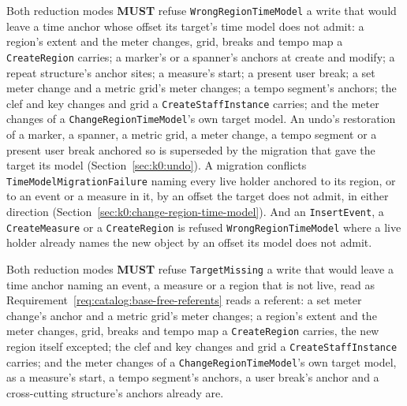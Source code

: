 \documentclass[11pt,letterpaper]{report}
\newcounter{requirement}[chapter]
\newcommand{\MUST}{\textbf{MUST}}
\begin{document}
\begin{requirement}
  \label{req:catalog:anchor-offsets}
  Both reduction modes \MUST{} refuse \texttt{WrongRegionTimeModel} a write
  that would leave a time anchor whose offset its target's time model does not
  admit: a region's extent and the meter changes, grid, breaks and tempo map a
  \texttt{CreateRegion} carries; a marker's or a spanner's anchors at create and
  modify; a repeat structure's anchor sites; a measure's start; a present user
  break; a set meter change and a metric grid's meter changes; a tempo
  segment's anchors; the clef and key changes and grid a
  \texttt{CreateStaffInstance} carries; and the meter changes of a
  \texttt{ChangeRegionTimeModel}'s own target model. An undo's restoration of
  a marker, a spanner, a metric grid, a meter change, a tempo segment or a
  present user break anchored so is superseded by the migration that gave the
  target its model (Section~\ref{sec:k0:undo}). A migration conflicts
  \texttt{TimeModelMigrationFailure} naming every live holder anchored to its
  region, or to an event or a measure in it, by an offset the target does not
  admit, in either direction (Section~\ref{sec:k0:change-region-time-model}).
  And an \texttt{InsertEvent}, a \texttt{CreateMeasure} or a
  \texttt{CreateRegion} is refused \texttt{WrongRegionTimeModel} where a live
  holder already names the new object by an offset its model does not admit.
\end{requirement}

\begin{requirement}
  \label{req:catalog:anchor-targets}
  Both reduction modes \MUST{} refuse \texttt{TargetMissing} a write that
  would leave a time anchor naming an event, a measure or a region that is not
  live, read as Requirement~\ref{req:catalog:base-free-referents} reads a
  referent: a set meter change's anchor and a metric grid's meter changes; a
  region's extent and the meter changes, grid, breaks and tempo map a
  \texttt{CreateRegion} carries, the new region itself excepted; the clef and
  key changes and grid a \texttt{CreateStaffInstance} carries; and the meter
  changes of a \texttt{ChangeRegionTimeModel}'s own target model, as a
  measure's start, a tempo segment's anchors, a user break's anchor and a
  cross-cutting structure's anchors already are.
\end{requirement}
\end{document}
